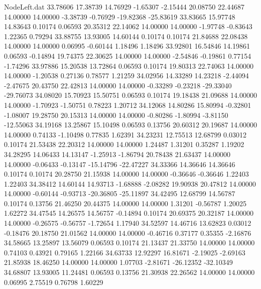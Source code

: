\begin{filecontents}{NodeLeft.dat}
  33.78606   17.38739   14.76929    -1.65307   -2.15444   20.08750   22.44687   14.00000   14.00000   -3.38739   -0.76929  -19.82368  -25.83619
  33.83665   15.97748   14.83643     0.10174    0.06593   20.35312   22.14062   14.00000   14.00000   -1.97748   -0.83643    1.22365    0.79294
  33.88755   13.93005   14.60144     0.10174    0.10174   21.84688   22.08438   14.00000   14.00000    0.06995   -0.60144    1.18496    1.18496
  33.92801   16.54846   14.19861     0.06593   -0.14894   19.74375   22.30625   14.00000   14.00000   -2.54846   -0.19861    0.77154   -1.74296
  33.97886   15.20538   13.72864     0.06593    0.10174   19.80313   22.74063   14.00000   14.00000   -1.20538    0.27136    0.78577    1.21259
  34.02956   14.33289   14.23218    -2.44094   -2.47675   20.43750   22.42813   14.00000   14.00000   -0.33289   -0.23218  -29.33040  -29.76073
  34.08020   15.70923   15.50751     0.06593    0.10174   19.18438   21.09688   14.00000   14.00000   -1.70923   -1.50751    0.78223    1.20712
  34.12068   14.80286   15.80994    -0.32801   -1.08007   19.28750   20.15313   14.00000   14.00000   -0.80286   -1.80994   -3.81150  -12.55063
  34.19168   13.25867   15.10498     0.06593    0.13756   20.60312   20.19687   14.00000   14.00000    0.74133   -1.10498    0.77835    1.62391
  34.23231   12.75513   12.68799     0.03012    0.10174   21.53438   22.20312   14.00000   14.00000    1.24487    1.31201    0.35287    1.19202
  34.28295   14.06433   14.13147    -1.25913   -1.86794   20.78438   21.63437   14.00000   14.00000   -0.06433   -0.13147  -15.14796  -22.47227
  34.33366   14.36646   14.36646     0.10174    0.10174   20.28750   21.15938   14.00000   14.00000   -0.36646   -0.36646    1.22403    1.22403
  34.38412   14.60144   14.93713    -1.68888   -2.08282   19.90938   20.47812   14.00000   14.00000   -0.60144   -0.93713  -20.36805  -25.11897
  34.42495   12.68799   14.56787     0.10174    0.13756   21.46250   20.44375   14.00000   14.00000    1.31201   -0.56787    1.20025    1.62272
  34.47545   14.26575   14.56757    -0.14894    0.10174   20.69375   20.32187   14.00000   14.00000   -0.26575   -0.56757   -1.72654    1.17940
  34.52597   14.46716   13.62823     0.03012   -0.18476   20.18750   21.01562   14.00000   14.00000   -0.46716    0.37177    0.35355   -2.16876
  34.58665   13.25897   13.56079     0.06593    0.10174   21.13437   21.33750   14.00000   14.00000    0.74103    0.43921    0.79165    1.22166
  34.63733   12.92297   16.81671    -2.19025   -2.69163   21.85938   18.46250   14.00000   14.00000    1.07703   -2.81671  -26.12352  -32.10349
  34.68807   13.93005   11.24481     0.06593    0.13756   21.30938   22.26562   14.00000   14.00000    0.06995    2.75519    0.76798    1.60229

\end{filecontents}
